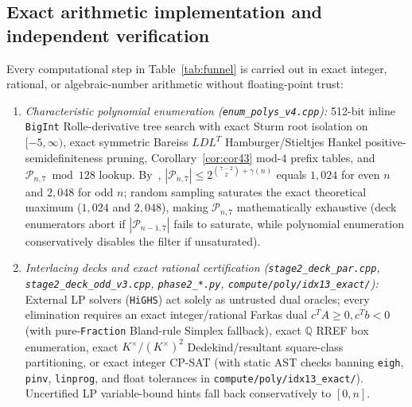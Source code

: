 \documentclass[11pt,reqno]{amsart}
\theoremstyle{definition}
\theoremstyle{remark}
\begin{document}
\subsection{Exact arithmetic implementation and independent verification}
Every computational step in Table~\ref{tab:funnel} is carried out in exact integer, rational, or algebraic-number arithmetic without floating-point trust:
\begin{enumerate}
  \item \emph{Characteristic polynomial enumeration (\nolinkurl{enum_polys_v4.cpp}):} 512-bit inline \texttt{BigInt} Rolle-derivative tree search with exact Sturm root isolation on $[-5, \infty)$, exact symmetric Bareiss $LDL^T$ Hamburger/Stieltjes Hankel positive-semidefiniteness pruning, Corollary~\ref{cor:cor43} mod-$4$ prefix tables, and $\mathcal{P}_{n,7} \bmod 128$ lookup. By~\cite[Cor.~3.3 and Cor.~3.13]{GY2019}, $|\mathcal{P}_{n,7}| \le 2^{\binom{7-2}{2} + \gamma(n)}$ equals $1{,}024$ for even $n$ and $2{,}048$ for odd $n$; random sampling saturates the exact theoretical maximum ($1{,}024$ and $2{,}048$), making $\mathcal{P}_{n,7}$ mathematically exhaustive (deck enumerators abort if $|\mathcal{P}_{n-1,7}|$ fails to saturate, while polynomial enumeration conservatively disables the filter if unsaturated).
  \item \emph{Interlacing decks and exact rational certification (\nolinkurl{stage2_deck_par.cpp}, \nolinkurl{stage2_deck_odd_v3.cpp}, \nolinkurl{phase2_*.py}, \nolinkurl{compute/poly/idx13_exact/}):} External LP solvers (\texttt{HiGHS}) act solely as untrusted dual oracles; every elimination requires an exact integer/rational Farkas dual $c^T A \ge 0, c^T b < 0$ (with pure-\texttt{Fraction} Bland-rule Simplex fallback), exact $\mathbb{Q}$ RREF box enumeration, exact $K^\times/(K^\times)^2$ Dedekind/resultant square-class partitioning, or exact integer CP-SAT (with static AST checks banning \texttt{eigh}, \texttt{pinv}, \texttt{linprog}, and float tolerances in \nolinkurl{compute/poly/idx13_exact/}). Uncertified LP variable-bound hints fall back conservatively to $[0, n]$.

\end{enumerate}
\end{document}
